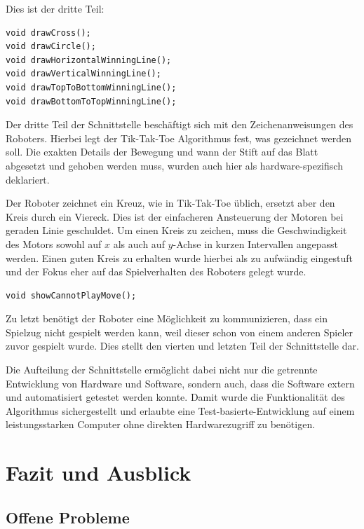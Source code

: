 \documentclass[conference,compsoc,final,a4paper]{IEEEtran}
\begin{document}
Dies ist der dritte Teil:

\begin{verbatim}
void drawCross();
void drawCircle();
void drawHorizontalWinningLine();
void drawVerticalWinningLine();
void drawTopToBottomWinningLine();
void drawBottomToTopWinningLine();
\end{verbatim}

Der dritte Teil der Schnittstelle beschäftigt sich mit den Zeichenanweisungen des Roboters. Hierbei legt der
Tik-Tak-Toe Algorithmus fest, was gezeichnet werden soll. Die exakten Details der Bewegung und wann der Stift
auf das Blatt abgesetzt und gehoben werden muss, wurden auch hier als hardware-spezifisch deklariert.

Der Roboter zeichnet ein Kreuz, wie in Tik-Tak-Toe üblich, ersetzt aber den Kreis durch ein Viereck. Dies ist
der einfacheren Ansteuerung der Motoren bei geraden Linie geschuldet. Um einen Kreis zu zeichen, muss die
Geschwindigkeit des Motors sowohl auf $x$ als auch auf $y$-Achse in kurzen Intervallen angepasst werden. Einen 
guten Kreis zu erhalten wurde hierbei als zu aufwändig eingestuft und der Fokus eher auf das Spielverhalten
des Roboters gelegt wurde.

\begin{verbatim}
void showCannotPlayMove();
\end{verbatim}

Zu letzt benötigt der Roboter eine Möglichkeit zu kommunizieren, dass ein Spielzug nicht gespielt werden kann,
weil dieser schon von einem anderen Spieler zuvor gespielt wurde. Dies stellt den vierten und letzten Teil der
Schnittstelle dar.

Die Aufteilung der Schnittstelle ermöglicht dabei nicht nur die getrennte Entwicklung von Hardware und Software,
sondern auch, dass die Software extern und automatisiert getestet werden konnte. Damit wurde die Funktionalität des Algorithmus
sichergestellt und erlaubte eine Test-basierte-Entwicklung auf einem leistungsstarken Computer ohne direkten
Hardwarezugriff zu benötigen.

\section{Fazit und Ausblick}

\subsection{Offene Probleme}
\end{document}
